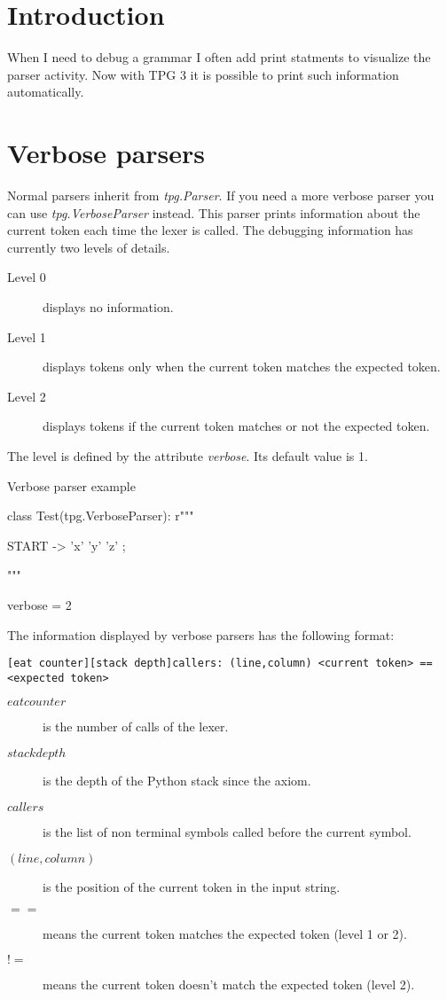 \section{Introduction}          \label{debug}

When I need to debug a grammar I often add print statments to visualize the parser activity.
Now with TPG 3 it is possible to print such information automatically.

\section{Verbose parsers}

Normal parsers inherit from \emph{tpg.Parser}.
If you need a more verbose parser you can use \emph{tpg.VerboseParser} instead.
This parser prints information about the current token each time the lexer is called.
The debugging information has currently two levels of details.

\begin{description}
    \item [Level 0] displays no information.
    \item [Level 1] displays tokens only when the current token matches the expected token.
    \item [Level 2] displays tokens if the current token matches or not the expected token.
\end{description}

The level is defined by the attribute \emph{verbose}. Its default value is 1.

\begin{code}
\caption{Verbose parser example}                            \label{debug:example}
\begin{verbatimtab}[4]
class Test(tpg.VerboseParser):
    r"""

    START -> 'x' 'y' 'z' ;

    """

    verbose = 2
\end{verbatimtab}
\end{code}

The information displayed by verbose parsers has the following format:
\begin{verbatim}
[eat counter][stack depth]callers: (line,column) <current token> == <expected token>
\end{verbatim}

\begin{description}
    \item [$eat counter$] is the number of calls of the lexer.
    \item [$stack depth$] is the depth of the Python stack since the axiom.
    \item [$callers$] is the list of non terminal symbols called before the current symbol.
    \item [$(line,column)$] is the position of the current token in the input string.
    \item [$==$] means the current token matches the expected token (level 1 or 2).
    \item [$!=$] means the current token doesn't match the expected token (level 2).
\end{description}
